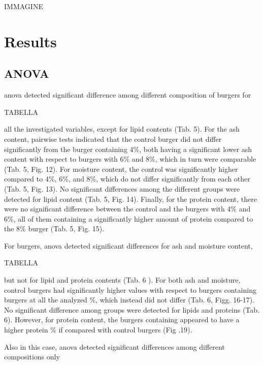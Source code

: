 IMMAGINE

\section{Results}
\subsection{ANOVA}
\gls{anova} detected significant difference among different composition of  burgers for 

TABELLA

all the investigated variables, except for lipid contents (Tab. 5). For the ash content, pairwise tests indicated that the control burger did not differ significantly from the burger containing 4\%, both having a significant lower ash content with respect to burgers with 6\% and 8\%, which in turn were comparable (Tab. 5, Fig. 12).
For moisture content, the control was significantly higher compared to 4\%, 6\%, and 8\%, which do not differ significantly from each other (Tab. 5, Fig. 13). No significant differences among the different groups were detected for lipid content (Tab. 5, Fig. 14). Finally, for the protein content, there were no significant difference between the control and the burgers with 4\% and 6\%, all of them containing a significantly higher amount of protein compared to the 8\% burger (Tab. 5, Fig. 15).



For  burgers, \gls{anova} detected significant differences for ash and moisture content, 

TABELLA

but not for lipid and protein contents (Tab. 6 ). For both ash and moisture, control burgers had significantly higher values with respect to burgers containing  burgers at all the analyzed \%, which instead did not differ (Tab. 6, Figg. 16-17). No significant difference among groups were detected for lipids and proteins (Tab. 6). However, for protein content, the burgers containing  appeared to have a higher protein \% if compared with control burgers (Fig .19).



Also in this case, \gls{anova} detected significant differences among different compositions only

